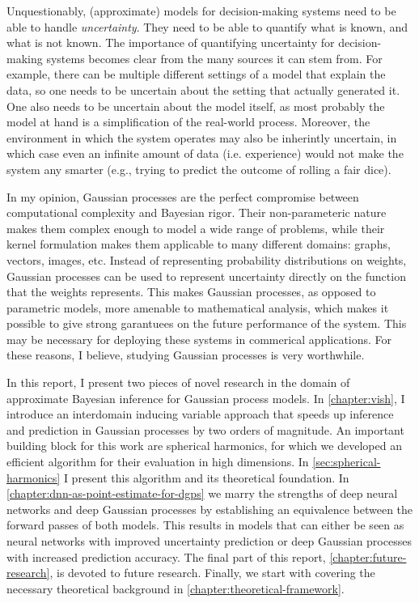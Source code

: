 Unquestionably, (approximate) models for decision-making systems need to be able to handle \emph{uncertainty}. They need to be able to quantify what is known, and what is not known. The importance of quantifying uncertainty for decision-making systems becomes clear from the many sources it can stem from. For example, there can be multiple different settings of a model that explain the data, so one needs to be uncertain about the setting that actually generated it. One also needs to be uncertain about the model itself, as most probably the model at hand is a simplification of the real-world process. Moreover, the environment in which the system operates may also be inherintly uncertain, in which case even an infinite amount of data (i.e. experience) would not make the system any smarter (e.g., trying to predict the outcome of rolling a fair dice).

In my opinion, Gaussian processes are the perfect compromise between computational complexity and Bayesian rigor. Their non-parameteric nature makes them complex enough to model a wide range of problems, while their kernel formulation makes them applicable to many different domains: graphs, vectors, images, etc. Instead of representing probability distributions on weights, Gaussian processes can be used to represent uncertainty directly on the function that the weights represents. This makes Gaussian processes, as opposed to parametric models, more amenable to mathematical analysis, which makes it possible to give strong garantuees on the future performance of the system. This may be necessary for deploying these systems in commerical applications. For these reasons, I believe, studying Gaussian processes is very worthwhile.

In this report, I present two pieces of novel research in the domain of approximate Bayesian inference for Gaussian process models. In \cref{chapter:vish}, I introduce an interdomain inducing variable approach that speeds up inference and prediction in Gaussian processes by two orders of magnitude. An important building block for this work are spherical harmonics, for which we developed an efficient algorithm for their evaluation in high dimensions. In \cref{sec:spherical-harmonics} I present this algorithm and its theoretical foundation. In \cref{chapter:dnn-as-point-estimate-for-dgps} we marry the strengths of deep neural networks and deep Gaussian processes by establishing an equivalence between the forward passes of both models. This results in models that can either be seen as neural networks with improved uncertainty prediction or deep Gaussian processes with increased prediction accuracy. The final part of this report, \cref{chapter:future-research}, is devoted to future research. Finally, we start with covering the necessary theoretical background in \cref{chapter:theoretical-framework}.

